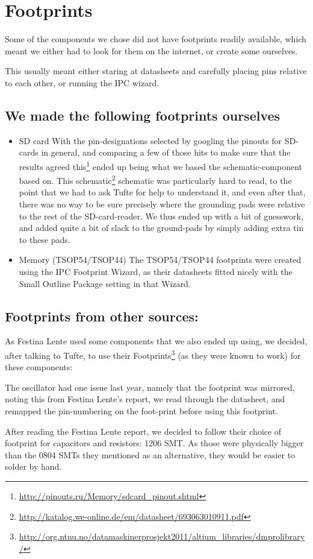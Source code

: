 \section {Footprints}
Some of the components we chose did not have footprints readily available, which
meant we either had to look for them on the internet, or create some ourselves.

This usually meant either staring at datasheets and carefully placing pins
relative to each other, or running the IPC wizard.

\subsection{We made the following footprints ourselves}

\begin{itemize}
\item \ac{SD} card With the pin-designations selected by googling the pinouts
  for SD-cards in general, and comparing a few of those hits to make sure that
  the results agreed
  this\footnote{\url{http://pinouts.ru/Memory/sdcard_pinout.shtml}} ended up
  being what we based the schematic-component based on. This
  schematic\footnote{\url{http://katalog.we-online.de/em/datasheet/693063010911.pdf}}
  schematic was particularly hard to read, to the point that we had to ask Tufte
  for help to understand it, and even after that, there was no way to be sure
  precisely where the grounding pads were relative to the rest of the
  SD-card-reader. We thus ended up with a bit of guesswork, and added quite a
  bit of slack to the ground-pads by simply adding extra tin to these pads.
\item Memory (TSOP54/TSOP44)
The TSOP54/TSOP44 footprints were created using the IPC Footprint Wizard, as
their datasheets fitted nicely with the Small Outline Package setting in that
Wizard.
\end {itemize}

\subsection{Footprints from other sources:}
As Festina Lente used some components that we also ended up using, we decided,
after talking to Tufte, to use their Footprints\footnote{\url{http://org.ntnu.no/datamaskinerprosjekt2011/altium_libraries/dmprolibrary/}}
(as they were known to work) for these components:


The oscillator had one issue last year, namely that the
footprint was mirrored, noting this from Festina Lente's report, we read
through the datasheet, and remapped the pin-numbering on the foot-print 
before using this footprint.

After reading the Festina Lente report\cite{berg2011festinalente}, we decided to
follow their choice of footprint for capacitors and resistors: 1206 SMT. As
those were physically bigger than the 0804 SMTs they mentioned as an
alternative, they would be easier to solder by hand.
